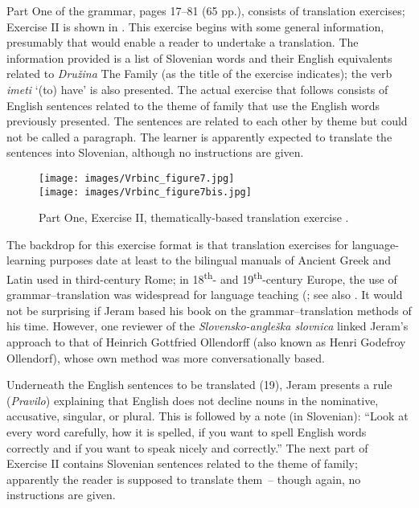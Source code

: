 \documentclass[output=paper,colorlinks,citecolor=brown,arabicfont,chinesefont]{langscibook}
\begin{document}
\largerpage
Part One of the grammar, pages 17–81 (65 pp.), consists of translation exercises; Exercise II is shown in . This exercise begins with some general information, presumably that would enable a reader to undertake a translation. The information provided is a list of Slovenian words and their English equivalents related to \emph{Družina} The Family (as the title of the exercise indicates); the verb \emph{imeti} ‘(to) have’ is also presented. The actual exercise that follows consists of English sentences related to the theme of family that use the English words previously presented. The sentences are related to each other by theme but could not be called a paragraph. The learner is apparently expected to translate the sentences into Slovenian, although no instructions are given.

\begin{figure}
\texttt{[image: images/Vrbinc\_figure7.jpg]}\\
\texttt{[image: images/Vrbinc\_figure7bis.jpg]}
\caption{Part One, Exercise II, thematically-based translation exercise \citep[18--19]{Jeram1895}.}
\label{vrbinc:fig7}
\end{figure}

The backdrop for this exercise format is that translation exercises for language-learning purposes date at least to the bilingual manuals of Ancient Greek and Latin used in third-century Rome; in 18\textsuperscript{th}- and 19\textsuperscript{th}-century Europe, the use of grammar–translation was widespread for language teaching (\citealt{Hernandez_jaramillo2019}; see also \citealt{Zhou2015}. It would not be surprising if Jeram based his book on the grammar–translation methods of his time. However, one reviewer of the \emph{Slovensko-angleška slovnica} \citep{Anonymous1895} linked Jeram’s approach to that of Heinrich Gottfried Ollendorff (also known as Henri Godefroy Ollendorf), whose own method was more conversationally based.

Underneath the English sentences to be translated (19), Jeram presents a rule (\emph{Pravilo}) explaining that English does not decline nouns in the nominative, accusative, singular, or plural. This is followed by a note (in Slovenian): “Look at every word carefully, how it is spelled, if you want to spell English words correctly and if you want to speak nicely and correctly.” The next part of Exercise II contains Slovenian sentences related to the theme of family; apparently the reader is supposed to translate them~-- though again, no instructions are given. 
\end{document}
